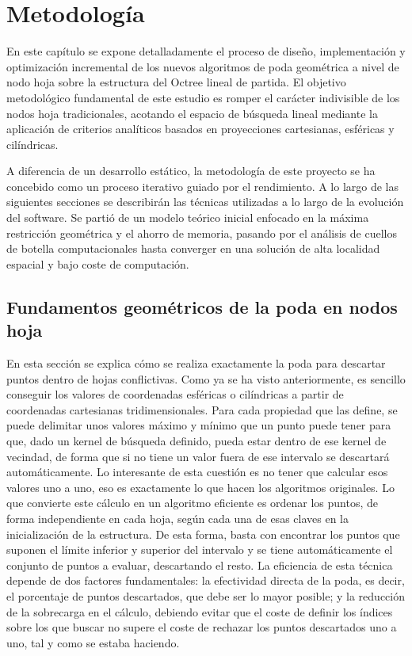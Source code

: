 \chapter{Metodología}

En este capítulo se expone detalladamente el proceso de diseño, implementación y optimización incremental de los nuevos algoritmos de poda geométrica a nivel de nodo hoja sobre la estructura del Octree lineal de partida. El objetivo metodológico fundamental de este estudio es romper el carácter indivisible de los nodos hoja tradicionales, acotando el espacio de búsqueda lineal mediante la aplicación de criterios analíticos basados en proyecciones cartesianas, esféricas y cilíndricas.

A diferencia de un desarrollo estático, la metodología de este proyecto se ha concebido como un proceso iterativo guiado por el rendimiento. A lo largo de las siguientes secciones se describirán las técnicas utilizadas a lo largo de la evolución del software. Se partió de un modelo teórico inicial enfocado en la máxima restricción geométrica y el ahorro de memoria, pasando por el análisis de cuellos de botella computacionales hasta converger en una solución de alta localidad espacial y bajo coste de computación.

\section{Fundamentos geométricos de la poda en nodos hoja}
En esta sección se explica cómo se realiza exactamente la poda para descartar puntos dentro de hojas conflictivas. Como ya se ha visto anteriormente, es sencillo conseguir los valores de coordenadas esféricas o cilíndricas a partir de coordenadas cartesianas tridimensionales. Para cada propiedad que las define, se puede delimitar unos valores máximo y mínimo que un punto puede tener para que, dado un kernel de búsqueda definido, pueda estar dentro de ese kernel de vecindad, de forma que si no tiene un valor fuera de ese intervalo se descartará automáticamente. Lo interesante de esta cuestión es no tener que calcular esos valores uno a uno, eso es exactamente lo que hacen los algoritmos originales. Lo que convierte este cálculo en un algoritmo eficiente es ordenar los puntos, de forma independiente en cada hoja, según cada una de esas claves en la inicialización de la estructura. De esta forma, basta con encontrar los puntos que suponen el límite inferior y superior del intervalo y se tiene automáticamente el conjunto de puntos a evaluar, descartando el resto. La eficiencia de esta técnica depende de dos factores fundamentales: la efectividad directa de la poda, es decir, el porcentaje de puntos descartados, que debe ser lo mayor posible; y la reducción de la sobrecarga en el cálculo, debiendo evitar que el coste de definir los índices sobre los que buscar no supere el coste de rechazar los puntos descartados uno a uno, tal y como se estaba haciendo.


